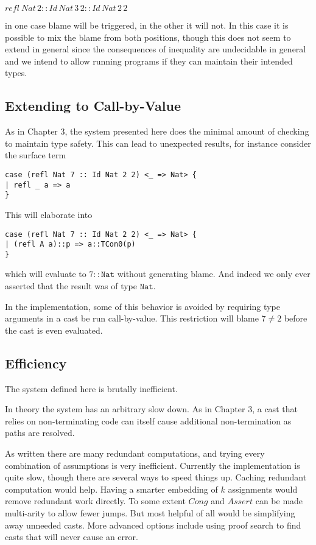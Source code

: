 $refl\ Nat\,2::Id\,Nat\,3\,2::Id\,Nat\,2\,2$

in one case blame will be triggered, in the other it will not. In
this case it is possible to mix the blame from both positions, though
this does not seem to extend in general since the consequences of
inequality are undecidable in general and we intend to allow running
programs if they can maintain their intended types.

\subsection{Extending to Call-by-Value}

As in Chapter 3, the system presented here does the minimal amount
of checking to maintain type safety. This can lead to unexpected results,
for instance consider the surface term 

\begin{lstlisting}[basicstyle={\ttfamily\small}]
case (refl Nat 7 :: Id Nat 2 2) <_ => Nat> {
| refl _ a => a
}
\end{lstlisting}

This will elaborate into 

\begin{lstlisting}[basicstyle={\ttfamily\small}]
case (refl Nat 7 :: Id Nat 2 2) <_ => Nat> {
| (refl A a)::p => a::TCon0(p)
}
\end{lstlisting}

which will evaluate to $7::\mathtt{Nat}$ without generating blame.
And indeed we only ever asserted that the result was of type $\mathtt{Nat}$.

In the implementation, some of this behavior is avoided by requiring
type arguments in a cast be run call-by-value. This restriction will
blame $7\neq2$ before the cast is even evaluated.

\subsection{Efficiency}

The system defined here is brutally inefficient. 

In theory the system has an arbitrary slow down. As in Chapter 3,
a cast that relies on non-terminating code can itself cause additional
non-termination as paths are resolved.

As written there are many redundant computations, and trying every
combination of assumptions is very inefficient. Currently the implementation
is quite slow, though there are several ways to speed things up. Caching
redundant computation would help. Having a smarter embedding of $k$
assignments would remove redundant work directly. To some extent $Cong$
and $Assert$ can be made multi-arity to allow fewer jumps. But most
helpful of all would be simplifying away unneeded casts. More advanced
options include using proof search to find casts that will never cause
an error.


